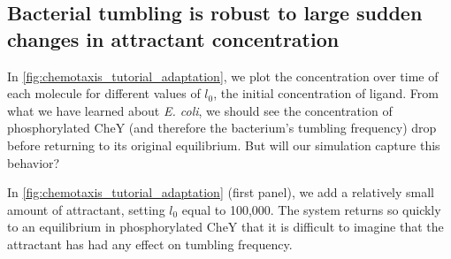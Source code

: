 

\FloatBarrier
{}
\subsection{Bacterial tumbling is robust to large sudden changes in attractant concentration}

In \autoref{fig:chemotaxis_tutorial_adaptation}, we plot the concentration over time of each molecule for different values of $l_0$, the initial concentration of ligand. From what we have learned about \textit{E. coli}, we should see the concentration of phosphorylated CheY (and therefore the bacterium's tumbling frequency) drop before returning to its original equilibrium. But will our simulation capture this behavior?

In \autoref{fig:chemotaxis_tutorial_adaptation} (first panel), we add a relatively small amount of attractant, setting $l_0$ equal to 100,000. The system returns so quickly to an equilibrium in phosphorylated CheY that it is difficult to imagine that the attractant has had any effect on tumbling frequency.

